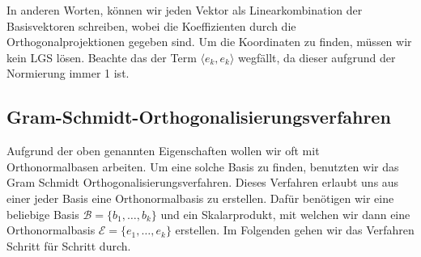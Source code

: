 In anderen Worten, können wir jeden Vektor als Linearkombination der Basisvektoren schreiben, wobei die Koeffizienten durch die Orthogonalprojektionen gegeben sind. Um die Koordinaten zu finden, müssen wir kein LGS lösen. Beachte das der Term \( \langle e_k, e_k \rangle \) wegfällt, da dieser aufgrund der Normierung immer 1 ist.

\subsection{Gram-Schmidt-Orthogonalisierungsverfahren}

Aufgrund der oben genannten Eigenschaften wollen wir oft mit Orthonormalbasen arbeiten. Um eine solche Basis zu finden, benutzten wir das Gram Schmidt Orthogonalisierungsverfahren. Dieses Verfahren erlaubt uns aus einer jeder Basis eine Orthonormalbasis zu erstellen. Dafür benötigen wir eine beliebige Basis \( \mathcal{B} = \{ b_1, \ldots, b_k \} \) und ein Skalarprodukt, mit welchen wir dann eine Orthonormalbasis \( \mathcal{E} = \{ e_1, \ldots, e_k \} \) erstellen. Im Folgenden gehen wir das Verfahren Schritt für Schritt durch.

\newpage

